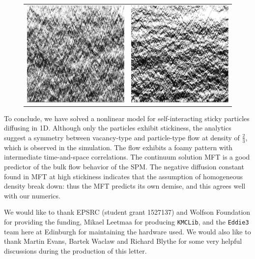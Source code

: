 \documentclass[
reprint,
 amsmath,amssymb,
 aps,
 prl,
]{revtex4-1}
\begin{document}
\begin{figure}[h!]
\begin{center}
\begin{tabular}{c | c}
    \includegraphics[width=0.49\linewidth]{longTime} &\includegraphics[width=0.49\linewidth]{midLongTime}
    \end{tabular}
\end{center}
    \vspace{-2em}
\end{figure}


To conclude, we have solved a nonlinear model for self-interacting sticky particles diffusing in 1D.  Although only the particles exhibit stickiness,  the analytics suggest a symmetry between vacancy-type and particle-type flow
at density of $\frac{2}{3}$, which is observed in the simulation.  The flow exhibits a foamy pattern with intermediate time-and-space correlations.  The continuum solution MFT is a good predictor of the bulk flow behavior of the SPM.
The negative diffusion constant found in MFT at high stickiness indicates  that the assumption of homogeneous density break down: thus the MFT predicts its own demise, and this agrees well with our numerics.

We would like to thank EPSRC (student grant 1527137) and Wolfson Foundation for providing the funding, Mikael Leetmaa for producing \texttt{KMCLib}, and the \texttt{Eddie3} team here at Edinburgh for maintaining the hardware used.
We would also like to thank Martin Evans, Bartek Waclaw and Richard Blythe for some very helpful discussions during the production of this letter.


\end{document}
